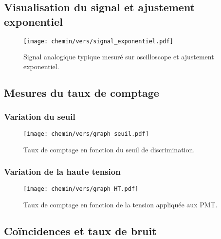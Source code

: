\documentclass[a4paper]{article}
\begin{document}
    \subsection{Visualisation du signal et ajustement exponentiel}
    
    \begin{figure}[H]
        \centering
        \texttt{[image: chemin/vers/signal\_exponentiel.pdf]}
        \caption{Signal analogique typique mesur\'e sur oscilloscope et ajustement exponentiel.}
        \label{fig:signal_exp}
    \end{figure}
    
    \subsection{Mesures du taux de comptage}
    
    \subsubsection{Variation du seuil}
    \begin{figure}[H]
        \centering
        \texttt{[image: chemin/vers/graph\_seuil.pdf]}
        \caption{Taux de comptage en fonction du seuil de discrimination.}
        \label{fig:taux_vs_seuil}
    \end{figure}
    
    \subsubsection{Variation de la haute tension}
    \begin{figure}[H]
        \centering
        \texttt{[image: chemin/vers/graph\_HT.pdf]}
        \caption{Taux de comptage en fonction de la tension appliqu\'ee aux PMT.}
        \label{fig:taux_vs_HT}
    \end{figure}
    
    \subsection{Co\"incidences et taux de bruit}
    
\end{document}
